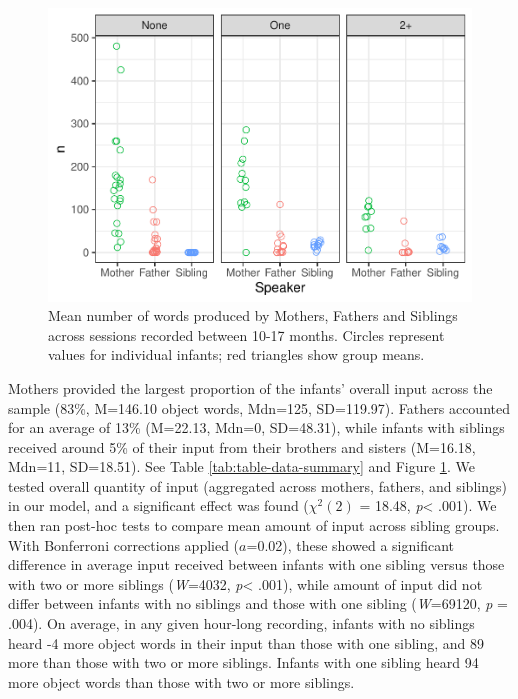 \documentclass[
  english,
  man,floatsintext]{apa6}
\begin{document}
\begin{figure}
\centering
\includegraphics{SiblingsStudyText_files/figure-latex/Figure-Speaker-count-1.pdf}
\caption{\label{fig:Figure-Speaker-count}Mean number of words produced by Mothers, Fathers and Siblings across sessions recorded between 10-17 months. Circles represent values for individual infants; red triangles show group means.}
\end{figure}

Mothers provided the largest proportion of the infants' overall input across the sample (83\%, M=146.10 object words, Mdn=125, SD=119.97). Fathers accounted for an average of 13\% (M=22.13, Mdn=0, SD=48.31), while infants with siblings received around 5\% of their input from their brothers and sisters (M=16.18, Mdn=11, SD=18.51). See Table \ref{tab:table-data-summary} and Figure \ref{fig:Figure-Speaker-count}. We tested overall quantity of input (aggregated across mothers, fathers, and siblings) in our model, and a significant effect was found (\(\chi^2 (2)\) = 18.48, \emph{p}\textless{} .001). We then ran post-hoc tests to compare mean amount of input across sibling groups. With Bonferroni corrections applied (\(a\)=0.02), these showed a significant difference in average input received between infants with one sibling versus those with two or more siblings (\emph{W}=4032, \emph{p}\textless{} .001), while amount of input did not differ between infants with no siblings and those with one sibling (\emph{W}=69120, \emph{p} = .004). On average, in any given hour-long recording, infants with no siblings heard -4 more object words in their input than those with one sibling, and 89 more than those with two or more siblings. Infants with one sibling heard 94 more object words than those with two or more siblings.
\end{document}
